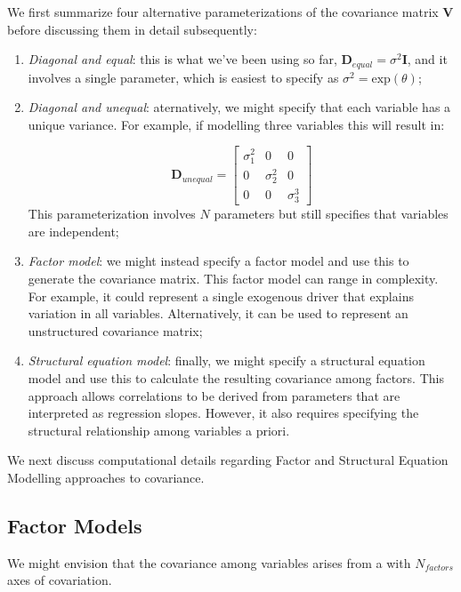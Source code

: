 We first summarize four alternative parameterizations of the covariance matrix \( \mathbf{V} \) before discussing them in detail subsequently: 
\begin{enumerate}
    \item \textit{Diagonal and equal}:  this is what we've been using so far, \( \mathbf{D}_{equal} = \sigma^2 \mathbf{I} \), and it involves a single parameter, which is easiest to specify as \( \sigma^2 = \mathrm{exp}(\theta) \);

    \item \textit{Diagonal and unequal}:  aternatively, we might specify that each variable has a unique variance. For example, if modelling three variables this will result in:
    
\begin{equation}
    \mathbf{D}_{unequal} = \begin{bmatrix}
    \sigma_1^2 & 0 & 0 \\
    0 & \sigma_2^2 & 0 \\
    0 & 0 & \sigma_3^3
    \end{bmatrix}    
\end{equation}
    This parameterization involves \(N\) parameters but still specifies that variables are independent;

    \item \textit{Factor model}:  we might instead specify a factor model and use this to generate the covariance matrix.  This factor model can range in complexity.  For example, it could represent a single exogenous driver that explains variation in all variables.  Alternatively, it can be used to represent an unstructured covariance matrix;  

    \item \textit{Structural equation model}:  finally, we might specify a structural equation model and use this to calculate the resulting covariance among factors.  This approach allows correlations to be derived from parameters that are interpreted as regression slopes.  However, it also requires specifying the structural relationship among variables a priori. 
\end{enumerate}
We next discuss computational details regarding Factor and Structural Equation Modelling approaches to covariance.   
 
\subsection{Factor Models} \label{sec:Chap4_factor_model} 
We might envision that the covariance among variables arises from a  with \(N_{factors}\) axes of covariation.  
    
